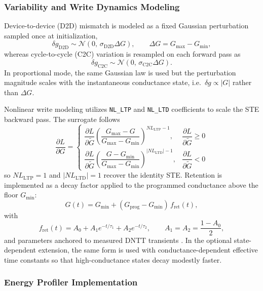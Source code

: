 \subsubsection{Variability and Write Dynamics Modeling}

Device-to-device (D2D) mismatch is modeled as a fixed Gaussian perturbation sampled once at initialization,
\[
\delta g_{\mathrm{D2D}} \sim \mathcal{N}\!\left(0,\, \sigma_{\mathrm{D2D}}\Delta G\right),
\qquad
\Delta G = G_{\max}-G_{\min},
\]
whereas cycle-to-cycle (C2C) variation is resampled on each forward pass as
\[
\delta g_{\mathrm{C2C}} \sim \mathcal{N}\!\left(0,\, \sigma_{\mathrm{C2C}}\Delta G\right).
\]
In proportional mode, the same Gaussian law is used but the perturbation magnitude scales with the instantaneous conductance state, i.e.\ $\delta g \propto |G|$ rather than $\Delta G$.

Nonlinear write modeling utilizes \texttt{NL\_LTP} and \texttt{NL\_LTD} coefficients to scale the STE backward pass. The surrogate follows
\[
\frac{\partial L}{\partial G}
=
\begin{cases}
\dfrac{\partial L}{\partial \tilde{G}}
\left(\dfrac{G_{\max}-G}{G_{\max}-G_{\min}}\right)^{NL_{\mathrm{LTP}}-1},
& \dfrac{\partial L}{\partial \tilde{G}} \ge 0 \\[10pt]
\dfrac{\partial L}{\partial \tilde{G}}
\left(\dfrac{G-G_{\min}}{G_{\max}-G_{\min}}\right)^{|NL_{\mathrm{LTD}}|-1},
& \dfrac{\partial L}{\partial \tilde{G}} < 0
\end{cases}
\]
so $NL_{\mathrm{LTP}}=1$ and $|NL_{\mathrm{LTD}}|=1$ recover the identity STE. Retention is implemented as a decay factor applied to the programmed conductance above the floor $G_{\min}$:
\[
G(t)=G_{\min}+\left(G_{\mathrm{prog}}-G_{\min}\right)\,f_{\mathrm{ret}}(t),
\]
with
\[
f_{\mathrm{ret}}(t)=A_0 + A_1 e^{-t/\tau_1} + A_2 e^{-t/\tau_2},
\qquad
A_1=A_2=\frac{1-A_0}{2},
\]
and parameters anchored to measured DNTT transients \citep{vincze2025dualplasticity}. In the optional state-dependent extension, the same form is used with conductance-dependent effective time constants so that high-conductance states decay modestly faster.

\subsubsection{Energy Profiler Implementation}

